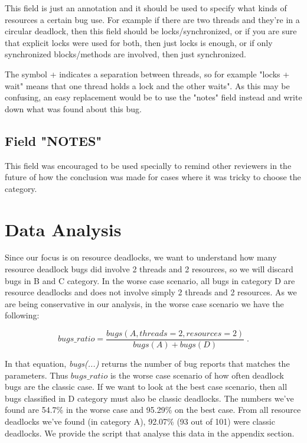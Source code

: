 This field is just an annotation and it should be used to specify what kinds of resources a certain bug use. For example if there are two threads and they're in a circular deadlock, then this field should be locks/synchronized, or if you are sure that explicit locks were used for both, then just locks is enough, or if only synchronized blocks/methods are involved, then just synchronized.

The symbol + indicates a separation between threads, so for example "locks + wait" means that one thread holds a lock and the other waits". As this may be confusing, an easy replacement would be to use the "notes" field instead and write down what was found about this bug.

\subsection{Field "NOTES"}

This field was encouraged to be used specially to remind other reviewers in the future of how the conclusion was made for cases where it was tricky to choose the category.

\section{Data Analysis}

Since our focus is on resource deadlocks, we want to understand how many resource deadlock bugs did involve 2 threads and 2 resources, so we will discard bugs in B and C category. In the worse case scenario, all bugs in category D are resource deadlocks and does not involve simply 2 threads and 2 resources. As we are being conservative in our analysis, in the worse case scenario we have the following:

\begin{equation}
bugs\_ratio = \frac{ bugs(A, threads=2, resources=2) }{ bugs(A) + bugs(D) } \; .
\end{equation}

In that equation, \emph{bugs(...)} returns the number of bug reports that matches the parameters. Thus $bugs\_ratio$ is the worse case scenario of how often deadlock bugs are the classic case. If we want to look at the best case scenario, then all bugs classified in D category must also be classic deadlocks. The numbers we've found are 54.7\% in the worse case and 95.29\% on the best case. From all resource deadlocks we've found (in category A), 92.07\% (93 out of 101) were classic deadlocks. We provide the script that analyse this data in the appendix section.

